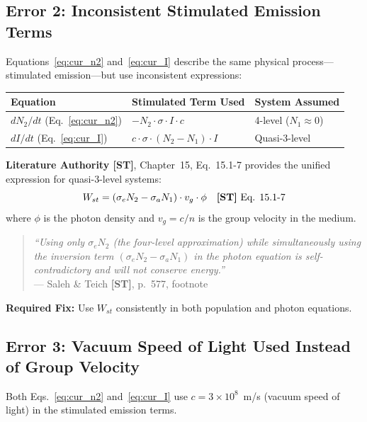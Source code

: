 \documentclass[12pt,a4paper]{article}
\begin{document}
\subsection{Error 2: Inconsistent Stimulated Emission Terms}

Equations~\ref{eq:cur_n2} and~\ref{eq:cur_I} describe the same physical process—stimulated emission—but use inconsistent expressions:

\begin{center}
\begin{tabular}{lll}
\toprule
\textbf{Equation} & \textbf{Stimulated Term Used} & \textbf{System Assumed} \\
\midrule
$dN_2/dt$ (Eq.~\ref{eq:cur_n2}) & $-N_2 \cdot \sigma \cdot I \cdot c$ & 4-level ($N_1 \approx 0$) \\
$dI/dt$ (Eq.~\ref{eq:cur_I}) & $c \cdot \sigma \cdot (N_2 - N_1) \cdot I$ & Quasi-3-level \\
\bottomrule
\end{tabular}
\end{center}

\textbf{Literature Authority [ST]}, Chapter~15, Eq.~15.1-7 provides the unified expression for quasi-3-level systems:
\begin{equation}
W_{st} = (\sigma_e N_2 - \sigma_a N_1) \cdot v_g \cdot \phi \quad \text{\textbf{[ST]} Eq. 15.1-7}
\end{equation}
where $\phi$ is the photon density and $v_g = c/n$ is the group velocity in the medium.

\begin{quote}
\textit{``Using only $\sigma_e N_2$ (the four-level approximation) while simultaneously using the inversion term $(\sigma_e N_2 - \sigma_a N_1)$ in the photon equation is self-contradictory and will not conserve energy.''} \\
--- Saleh \& Teich \textbf{[ST]}, p.~577, footnote
\end{quote}

\textbf{Required Fix:} Use $W_{st}$ consistently in both population and photon equations.

\subsection{Error 3: Vacuum Speed of Light Used Instead of Group Velocity}

Both Eqs.~\ref{eq:cur_n2} and~\ref{eq:cur_I} use $c = 3 \times 10^8$~m/s (vacuum speed of light) in the stimulated emission terms.
\end{document}
